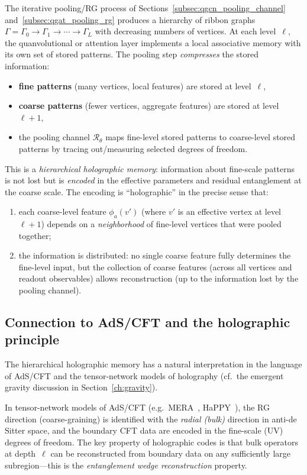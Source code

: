 \documentclass[11pt,oneside]{amsbook}
\numberwithin{equation}{section}
\theoremstyle{plain}
\theoremstyle{definition}
\theoremstyle{remark}
\begin{document}
The iterative pooling/RG process of Sections~\ref{subsec:qgcn_pooling_channel}
and~\ref{subsec:qgat_pooling_rg} produces a hierarchy of ribbon graphs
$\Gamma=\Gamma_0\to\Gamma_1\to\cdots\to\Gamma_L$
with decreasing numbers of vertices.
At each level~$\ell$, the quanvolutional or attention layer implements a local associative
memory with its own set of stored patterns.
The pooling step \emph{compresses} the stored information:
\begin{itemize}
\item \textbf{fine patterns} (many vertices, local features) are stored at level~$\ell$,
\item \textbf{coarse patterns} (fewer vertices, aggregate features) are stored at level~$\ell+1$,
\item the pooling channel $\mathcal{R}_\theta$ maps fine-level stored patterns to coarse-level
stored patterns by tracing out/measuring selected degrees of freedom.
\end{itemize}

This is a \emph{hierarchical holographic memory}:
information about fine-scale patterns is not lost but is \emph{encoded} in the effective
parameters and residual entanglement at the coarse scale.
The encoding is ``holographic'' in the precise sense that:
\begin{enumerate}
\item each coarse-level feature $\phi_a(v')$ (where $v'$ is an effective vertex at level $\ell+1$)
depends on a \emph{neighborhood} of fine-level vertices that were pooled together;
\item the information is distributed: no single coarse feature fully determines the fine-level
input, but the collection of coarse features (across all vertices and readout observables)
allows reconstruction (up to the information lost by the pooling channel).
\end{enumerate}

\subsection{Connection to AdS/CFT and the holographic principle}
\label{subsec:ads_cft_holographic}

The hierarchical holographic memory has a natural interpretation in the language of AdS/CFT
and the tensor-network models of holography (cf.\ the emergent gravity discussion in
Section~\ref{ch:gravity}).

In tensor-network models of AdS/CFT
(e.g.\ MERA~\cite{Vidal2007MERA}, HaPPY~\cite{Pastawski2015HAPPY}),
the RG direction (coarse-graining) is identified with the \emph{radial (bulk)} direction in anti-de
Sitter space, and the boundary CFT data are encoded in the fine-scale (UV) degrees of freedom.
The key property of holographic codes is that bulk operators at depth~$\ell$ can be reconstructed
from boundary data on any sufficiently large subregion---this is the \emph{entanglement wedge
reconstruction} property.
\end{document}
